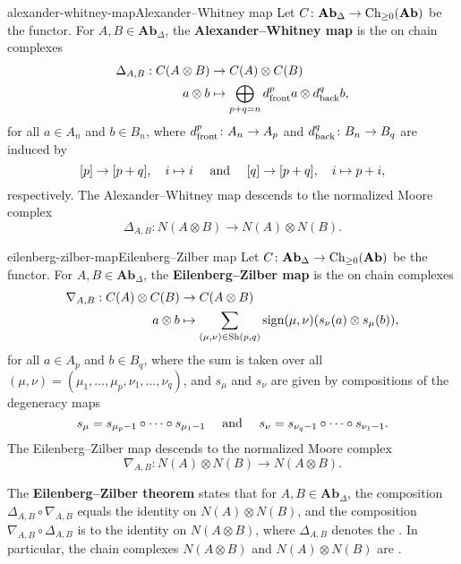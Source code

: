 \begin{topic}{alexander-whitney-map}{Alexander--Whitney map}
    Let $C \colon \textbf{Ab}_\Delta \to \textup{Ch}_{\ge 0}(\textbf{Ab})$ be the  functor. For $A, B \in \textbf{Ab}_\Delta$, the \textbf{Alexander--Whitney map} is the  on chain complexes
    \[ \begin{aligned}
        \Delta_{A, B} : C(A \otimes B) &\to C(A) \otimes C(B) \\
        a \otimes b &\mapsto \bigoplus_{p + q = n} d_\textup{front}^p a \otimes d_\textup{back}^q b ,
    \end{aligned} \]
    for all $a \in A_n$ and $b \in B_n$, where $d_\textup{front}^p \colon A_n \to A_p$ and $d_\textup{back}^q \colon B_n \to B_q$ are induced by
    \[ [p] \to [p + q], \quad i \mapsto i \quad \textup{ and } \quad [q] \to [p + q], \quad i \mapsto p + i , \]
    respectively. The Alexander--Whitney map descends to the normalized Moore complex
    \[ \Delta_{A, B} \colon N(A \otimes B) \to N(A) \otimes N(B) . \]
\end{topic}

\begin{topic}{eilenberg-zilber-map}{Eilenberg--Zilber map}
    Let $C \colon \textbf{Ab}_\Delta \to \textup{Ch}_{\ge 0}(\textbf{Ab})$ be the  functor. For $A, B \in \textbf{Ab}_\Delta$, the \textbf{Eilenberg--Zilber map} is the  on chain complexes
    \[ \begin{aligned}
        \nabla_{A, B} : C(A) \otimes C(B) &\to C(A \otimes B) \\
        a \otimes b &\mapsto \sum_{(\mu, \nu) \in \textup{Sh}(p, q)} \textup{sign}(\mu, \nu) (s_\nu(a) \otimes s_\mu(b)) ,
    \end{aligned} \]
    for all $a \in A_p$ and $b \in B_q$, where the sum is taken over all  $(\mu, \nu) = (\mu_1, \ldots, \mu_p, \nu_1, \ldots, \nu_q)$, and $s_\mu$ and $s_\nu$ are given by compositions of the degeneracy maps
    \[ s_\mu = s_{\mu_p - 1} \circ \cdots \circ s_{\mu_1 - 1} \quad \textup{ and } \quad s_\nu = s_{\nu_q - 1} \circ \cdots \circ s_{\nu_1 - 1} . \]
    The Eilenberg--Zilber map descends to the normalized Moore complex
    \[ \nabla_{A, B} \colon N(A) \otimes N(B) \to N(A \otimes B) . \]
    
    The \textbf{Eilenberg--Zilber theorem} states that for $A, B \in \textbf{Ab}_\Delta$, the composition $\Delta_{A, B} \circ \nabla_{A, B}$ equals the identity on $N(A) \otimes N(B)$, and the composition $\nabla_{A, B} \circ \Delta_{A, B}$ is  to the identity on $N(A \otimes B)$, where $\Delta_{A, B}$ denotes the . In particular, the chain complexes $N(A \otimes B)$ and $N(A) \otimes N(B)$ are .
\end{topic}

